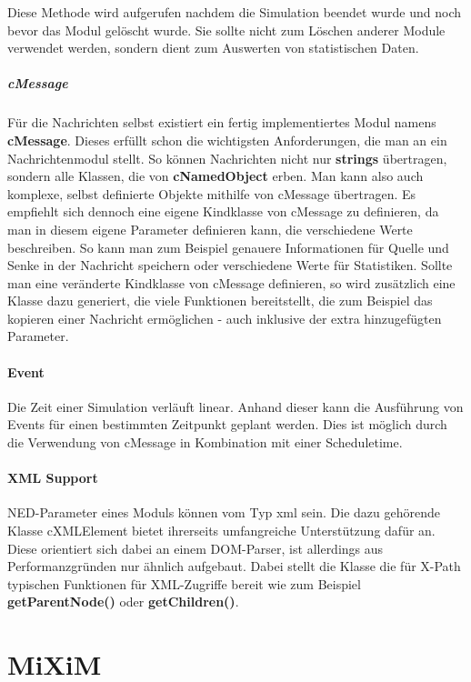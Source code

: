 Diese Methode wird aufgerufen nachdem die Simulation beendet wurde und noch bevor das Modul gelöscht wurde. Sie sollte nicht zum Löschen anderer Module verwendet werden, sondern dient zum Auswerten von statistischen Daten. 

\subparagraph{cMessage}

Für die Nachrichten selbst existiert ein fertig implementiertes Modul namens \textbf{cMessage}. Dieses erfüllt schon die wichtigsten Anforderungen, die man an ein Nachrichtenmodul stellt. So können Nachrichten nicht nur \textbf{strings} übertragen, sondern alle Klassen, die von \textbf{cNamedObject} erben. Man kann also auch komplexe, selbst definierte Objekte mithilfe von cMessage übertragen.
Es empfiehlt sich dennoch eine eigene Kindklasse von cMessage zu definieren, da man in diesem eigene Parameter definieren kann, die verschiedene Werte beschreiben. So kann man zum Beispiel genauere Informationen für Quelle und Senke in der Nachricht speichern oder verschiedene Werte für Statistiken. Sollte man eine veränderte Kindklasse von cMessage definieren, so wird zusätzlich eine Klasse dazu generiert, die viele Funktionen bereitstellt, die zum Beispiel das kopieren einer Nachricht ermöglichen - auch inklusive der extra hinzugefügten Parameter.

\paragraph{Event}

Die Zeit einer Simulation verläuft linear. Anhand dieser kann die Ausführung von Events für einen bestimmten Zeitpunkt geplant werden. Dies ist möglich durch die Verwendung von cMessage in Kombination mit einer Scheduletime.

\paragraph{XML Support}

NED-Parameter eines Moduls können vom Typ xml sein. Die dazu gehörende Klasse cXMLElement bietet ihrerseits umfangreiche Unterstützung dafür an. Diese orientiert sich dabei an einem DOM-Parser, ist allerdings aus Performanzgründen nur ähnlich aufgebaut. Dabei stellt die Klasse die für X-Path typischen Funktionen für XML-Zugriffe bereit wie zum Beispiel \textbf{getParentNode()} oder \textbf{getChildren()}.

\section{MiXiM}

